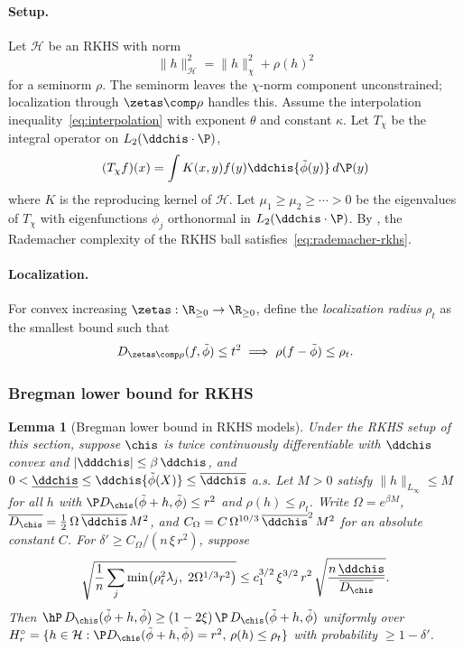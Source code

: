 \documentclass{article}
\newtheorem{lemma}[theorem]{Lemma}
\begin{document}
\paragraph{Setup.} Let $\mathcal{H}$ be an RKHS with norm
\[
\|h\|_{\mathcal{H}}^2 = \|h\|_\chi^2 + \rho(h)^2
\]
for a seminorm $\rho$. The seminorm leaves the $\chi$-norm component unconstrained; localization through $\zetas \comp \rho$ handles this. Assume the interpolation inequality~\eqref{eq:interpolation} with exponent $\theta$ and constant $\kappa$. Let $T_\chi$ be the integral operator on $L_2(\ddchis \cdot \P)$,
\[
(T_\chi f)(x) = \int K(x,y) f(y) \ddchis\{\tilde\phi(y)\} \, d\P(y)
\]
where $K$ is the reproducing kernel of $\mathcal{H}$. Let $\mu_1 \ge \mu_2 \ge \cdots > 0$ be the eigenvalues of $T_\chi$ with eigenfunctions $\phi_j$ orthonormal in $L_2(\ddchis \cdot \P)$. By , the Rademacher complexity of the RKHS ball satisfies~\eqref{eq:rademacher-rkhs}.

\paragraph{Localization.} For convex increasing $\zetas: \R_{\ge 0} \to \R_{\ge 0}$, define the \emph{localization radius} $\rho_t$ as the smallest bound such that
\[
D_{\zetas \comp \rho}(f, \tilde\phi) \le t^2 \implies \rho(f - \tilde\phi) \le \rho_t.
\]

\subsubsection{Bregman lower bound for RKHS}

\begin{lemma}[Bregman lower bound in RKHS models]
\label{lem:rkhs-ulb}
Under the RKHS setup of this section,
suppose $\chis$ is twice continuously differentiable
with $\ddchis$ convex
and $|\dddchis| \le \beta\,\ddchis$,
and $0 < \underline{\ddchis}
  \le \ddchis\{\tilde\phi(X)\}
  \le \overline{\ddchis}$ a.s.
Let $M > 0$ satisfy
$\|h\|_{L_\infty} \le M$
for all $h$ with
$\P D_{\chis}(\tilde\phi + h, \tilde\phi) \le r^2$
and $\rho(h) \le \rho_t$.
Write $\Omega = e^{\beta M}$,
$\overline{D_{\chis}} = \tfrac{1}{2}\,\Omega\, \overline{\ddchis}\, M^2$,
and $C_\Omega = C\,\Omega^{10/3}\,\overline{\ddchis}^2\,M^2$
for an absolute constant $C$.
For $\delta' \ge C_\Omega/(n\,\xi\,r^2)$, suppose
\begin{equation}\label{eq:rkhs-slb-condition}
\sqrt{\frac{1}{n}
  \sum_j \min\!\qty(\rho_t^2\lambda_j,\;
      2\Omega^{1/3}r^2)}
  \le c_1^{3/2}\,\xi^{3/2}\,r^2\,
    \sqrt{\frac{n\,\underline{\ddchis}}
      {\overline{D_{\chis}}}}.
\end{equation}
Then
$\hP\, D_{\chis}(\tilde\phi+h, \tilde\phi)
  \ge (1-2\xi)\, \P\, D_{\chis}(\tilde\phi+h, \tilde\phi)$
uniformly over
$H_r^\circ = \{h \in \mathcal{H} :
  \P D_{\chis}(\tilde\phi+h,\tilde\phi) = r^2,\,
  \rho(h) \le \rho_t\}$
with probability $\ge 1 - \delta'$.
\end{lemma}
\end{document}
